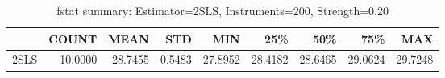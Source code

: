 \begin{table}[ht]
\centering
\caption{fstat summary: Estimator=2SLS, Instruments=200, Strength=0.20}
\begin{tabular}{lrrrrrrrr}
\toprule
 & COUNT & MEAN & STD & MIN & 25\% & 50\% & 75\% & MAX \\
\midrule
2SLS & 10.0000 & 28.7455 & 0.5483 & 27.8952 & 28.4182 & 28.6465 & 29.0624 & 29.7248 \\
\bottomrule
\end{tabular}
\end{table}
